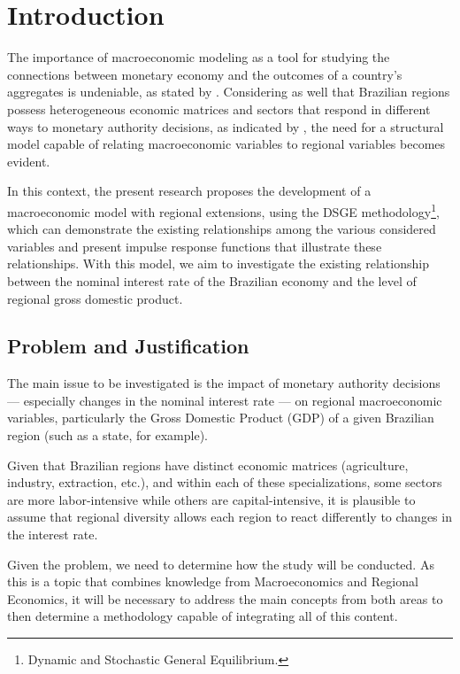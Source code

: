 \documentclass[
thesis.tex
]{subfiles}
\begin{document}
	\newpage

	\section{Introduction}\label{sec:introduction}

	The importance of macroeconomic modeling as a tool for studying the connections between monetary economy and the outcomes of a country's aggregates is undeniable, as stated by \textcite{gali_monetary_2015}. Considering as well that Brazilian regions possess heterogeneous economic matrices and sectors that respond in different ways to monetary authority decisions, as indicated by \textcite{bertanha_efeitos_2008}, the need for a structural model capable of relating macroeconomic variables to regional variables becomes evident.
	
	In this context, the present research proposes the development of a macroeconomic model with regional extensions, using the DSGE methodology\footnote{Dynamic and Stochastic General Equilibrium.}, which can demonstrate the existing relationships among the various considered variables and present impulse response functions that illustrate these relationships. With this model, we aim to investigate the existing relationship between the nominal interest rate of the Brazilian economy and the level of regional gross domestic product.
	
	\subsection*{Problem and Justification}
	
	The main issue to be investigated is the impact of monetary authority decisions --- especially changes in the nominal interest rate --- on regional macroeconomic variables, particularly the Gross Domestic Product (GDP) of a given Brazilian region (such as a state, for example).
	
	Given that Brazilian regions have distinct economic matrices (agriculture, industry, extraction, etc.), and within each of these specializations, some sectors are more labor-intensive while others are capital-intensive, it is plausible to assume that regional diversity allows each region to react differently to changes in the interest rate.
	
	Given the problem, we need to determine how the study will be conducted. As this is a topic that combines knowledge from Macroeconomics and Regional Economics, it will be necessary to address the main concepts from both areas to then determine a methodology capable of integrating all of this content.
	
\end{document}
